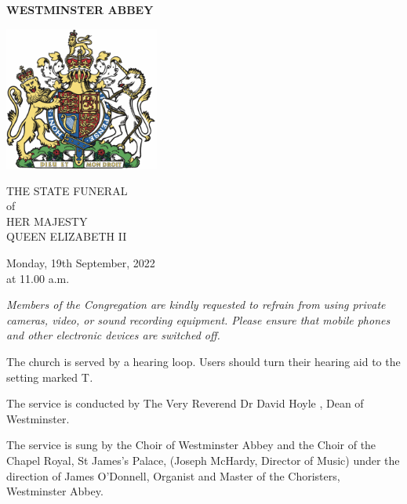 
\begin{center}\bfseries\Huge WESTMINSTER ABBEY

\vspace{1in}

\includegraphics[width=2in]{arms.png}


THE STATE FUNERAL\\
of\\
HER MAJESTY\\
QUEEN ELIZABETH II\\

\vspace{1in}


\normalfont\tnr\LARGE Monday, 19th September, 2022\\
at 11.00 a.m.
\end{center}
\clearpage
\color{qred}\itshape Members of the Congregation are kindly requested to refrain from using private cameras, video, or
sound recording equipment. Please ensure that mobile phones and other electronic devices are
switched off.

\vspace*{.5in}

The church is served by a hearing loop. Users should turn their hearing aid to the setting marked \normalfont T\itshape .


\vspace*{1in}

The service is conducted by The Very Reverend Dr David Hoyle , Dean of Westminster.

\vspace*{.5in}


The service is sung by the Choir of Westminster Abbey and the Choir of the Chapel Royal,
St James’s Palace, (Joseph McHardy, Director of Music) under the direction of James O’Donnell,
Organist and Master of the Choristers, Westminster Abbey.

